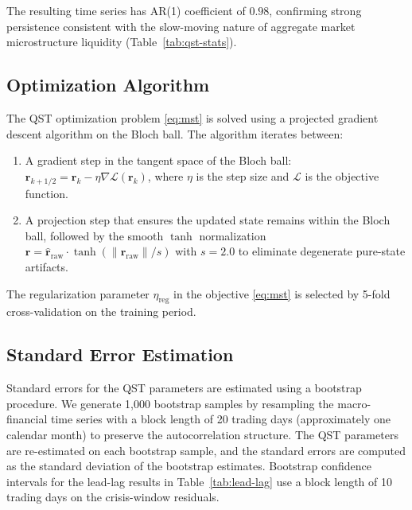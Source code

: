 The resulting time series has AR(1) coefficient of $0.98$, confirming strong
persistence consistent with the slow-moving nature of aggregate market
microstructure liquidity (Table~\ref{tab:qst-stats}).

\subsection{Optimization Algorithm}\label{sec:optimization}

The QST optimization problem \eqref{eq:mst} is solved using a projected gradient
descent algorithm on the Bloch ball. The algorithm iterates between:
\begin{enumerate}
    \item[(1)] A gradient step in the tangent space of the Bloch ball:
        $\mathbf{r}_{k+1/2} = \mathbf{r}_k - \eta \nabla \mathcal{L}(\mathbf{r}_k)$,
        where $\eta$ is the step size and $\mathcal{L}$ is the objective
        function.
    \item[(2)] A projection step that ensures the updated state remains within
        the Bloch ball, followed by the smooth $\tanh$ normalization
        $\mathbf{r} = \hat{\mathbf{r}}_{\mathrm{raw}}
        \cdot \tanh(\|\mathbf{r}_{\mathrm{raw}}\|/s)$ with $s = 2.0$ to
        eliminate degenerate pure-state artifacts.
\end{enumerate}
The regularization parameter $\eta_{\mathrm{reg}}$ in the objective
\eqref{eq:mst} is selected by 5-fold cross-validation on the training period.

\subsection{Standard Error Estimation}\label{sec:standard-errors}

Standard errors for the QST parameters are estimated using a bootstrap
procedure. We generate 1{,}000 bootstrap samples by resampling the
macro-financial time series with a block length of 20 trading days
(approximately one calendar month) to preserve the autocorrelation structure.
The QST parameters are re-estimated on each bootstrap sample, and the
standard errors are computed as the standard deviation of the bootstrap
estimates. Bootstrap confidence intervals for the lead-lag results in
Table~\ref{tab:lead-lag} use a block length of 10 trading days on the
crisis-window residuals.
